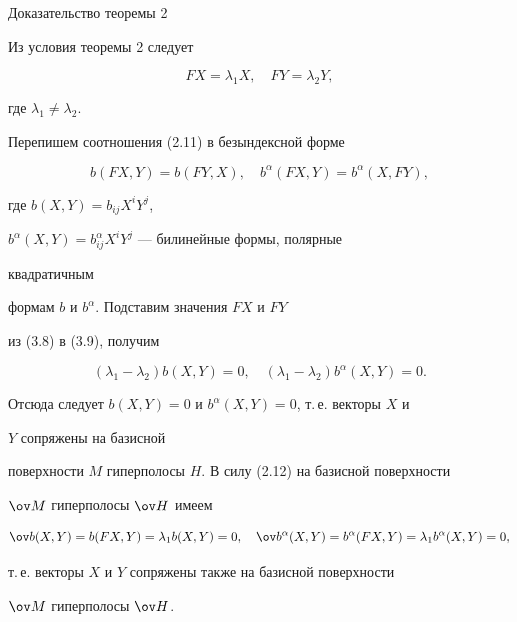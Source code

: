 \begin{pf*}{Доказательство теоремы 2} 


Из условия теоремы 2 следует 


\begin{equation} 


FX=\lambda_1X,\quad FY=\lambda_2Y, 


\end{equation} 


где $\lambda_1\ne\lambda_2$. 


Перепишем соотношения (2.11) в безындексной форме 


\begin{equation} 


b(FX,Y)=b(FY,X),\quad b^\alpha(FX,Y)=b^\alpha(X,FY), 


\end{equation} 


где $b(X,Y)=b_{ij}X^i Y^j$, 


$b^\alpha(X,Y)=b^\alpha_{ij}X^i Y^j$ --- билинейные формы, полярные 


квадратичным 


формам $b$ и $b^\alpha$. Подставим значения $FX$ и $FY$ 


из (3.8) в (3.9), получим 


$$ 


(\lambda_1-\lambda_2)b(X,Y)=0,\quad 


(\lambda_1-\lambda_2)b^\alpha(X,Y)=0. 


$$ 


Отсюда следует $b(X,Y)=0$ и $b^\alpha(X,Y)=0$, т.\,е. векторы $X$ и 


$Y$ сопряжены на базисной 


поверхности $M$ гиперполосы $H$. В силу (2.12) на базисной поверхности 


$\ov M$ гиперполосы $\ov H$ имеем 


$$ 


\ov b(X,Y)=b(FX,Y)=\lambda_1 b(X,Y)=0,\quad 


\ov b^\alpha(X,Y)=b^\alpha(FX,Y)= 


\lambda_1 b^\alpha(X,Y)=0, 


$$ 


т.\,е. векторы $X$ и $Y$ сопряжены также на базисной поверхности 


$\ov M$ гиперполосы $\ov H$. 


\end{pf*} 


 


